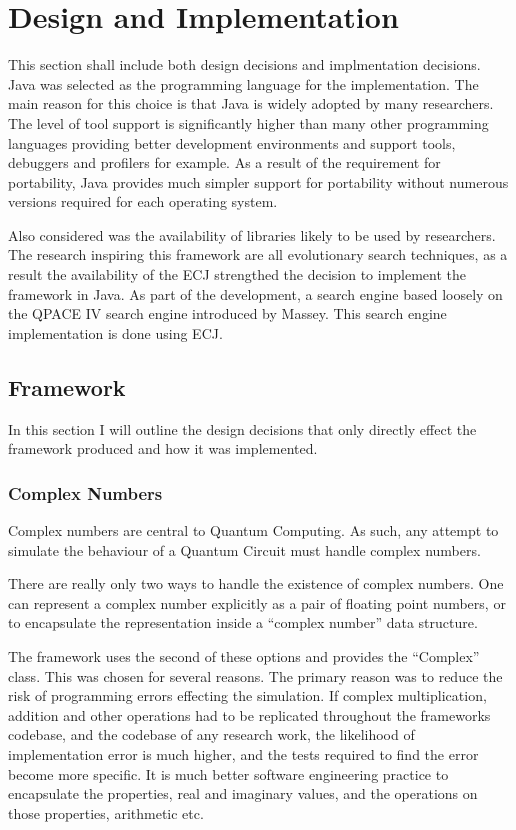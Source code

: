 \chapter{Design and Implementation}
\lstset{language=Java}
This section shall include both design decisions and implmentation decisions.
Java was selected as the programming language for the implementation.
The main reason for this choice is that Java is widely adopted by many researchers.
The level of tool support is significantly higher than many other programming languages providing better development environments and support tools, debuggers and profilers for example. 
As a result of the requirement for portability, Java provides much simpler support for portability without numerous versions required for each operating system.

Also considered was the availability of libraries likely to be used by researchers.
The research inspiring this framework are all evolutionary search techniques, as a result the availability of the ECJ\cite{ecjtool} strengthed the decision to implement the framework in Java.
As part of the development, a search engine based loosely on the QPACE IV search engine introduced by Massey\cite{masseythesis}.
This search engine implementation is done using ECJ.

\section{Framework}
In this section I will outline the design decisions that only directly effect the framework produced and how it was implemented.

\subsection{Complex Numbers}
Complex numbers are central to Quantum Computing.
As such, any attempt to simulate the behaviour of a Quantum Circuit must handle complex numbers.

There are really only two ways to handle the existence of complex numbers.
One can represent a complex number explicitly as a pair of floating point numbers, or to encapsulate the representation inside a ``complex number'' data structure.

The framework uses the second of these options and provides the ``Complex'' class.
This was chosen for several reasons.
The primary reason was to reduce the risk of programming errors effecting the simulation.
If complex multiplication, addition and other operations had to be replicated throughout the frameworks codebase, and the codebase of any research work, the likelihood of implementation error is much higher, and the tests required to find the error become more specific.
It is much better software engineering practice to encapsulate the properties, real and imaginary values, and the operations on those properties, arithmetic etc.

